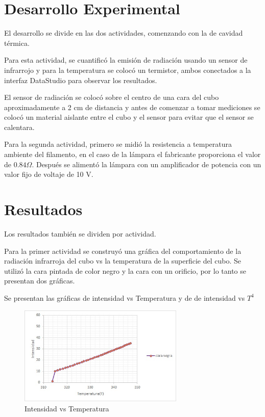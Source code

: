 \documentclass[12pt]{article}
\begin{document}
\vspace{-0.5cm}
\section{Desarrollo Experimental}
\vspace{-0.5cm}
El desarrollo se divide en las dos actividades, comenzando con la de cavidad térmica.

Para esta actividad, se cuantificó la emisión de radiación usando un sensor de infrarrojo y para la temperatura se colocó un termistor, ambos conectados a la interfaz DataStudio para observar los resultados.

El sensor de radiación se colocó sobre el centro de una cara del cubo aproximadamente a 2 cm de distancia y antes de comenzar a tomar mediciones se colocó un material aislante entre el cubo y el sensor para evitar que el sensor se calentara.

Para la segunda actividad, primero se midió la resistencia a temperatura ambiente del filamento, en el caso de la lámpara el fabricante proporciona el valor de $0.84 \Omega$.
Después se alimentó la lámpara con un amplificador de potencia con un valor fijo de voltaje de 10 V.



\section{Resultados}
Los resultados también se dividen por actividad.

Para la primer actividad se construyó una gráfica del comportamiento de la radiación infrarroja del cubo vs la temperatura de la superficie del cubo.
Se utilizó la cara pintada de color negro y la cara con un orificio, por lo tanto se presentan dos gráficas.

Se presentan las gráficas de intensidad vs Temperatura y de de intensidad vs $T^4$
\begin{figure}[H]
\begin{center}
\includegraphics[width=0.7\textwidth]{negra.jpg}  
\caption{Intensidad vs Temperatura}
\label{uno}
\end{center}
\end{figure}
\end{document}
